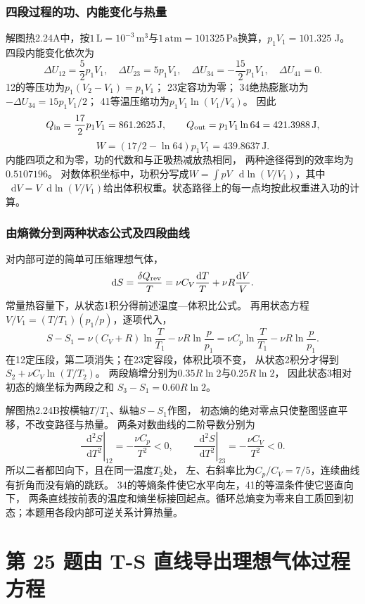 \documentclass[UTF8,fontset=fandol,a4paper,11pt]{ctexart}
\newcommand{\dd}{\mathop{}\!\mathrm{d}}
\begin{document}
\subsubsection*{四段过程的功、内能变化与热量}
解图热2.24A中，按$1\,\mathrm{L}=10^{-3}\,\mathrm{m^3}$与$1\,\mathrm{atm}=101325\,\mathrm{Pa}$换算，$p_1V_1=101.325$ J。
四段内能变化依次为
\[
\Delta U_{12}=\frac52p_1V_1,\quad
\Delta U_{23}=5p_1V_1,\quad
\Delta U_{34}=-\frac{15}{2}p_1V_1,\quad
\Delta U_{41}=0.
\]
12的等压功为$p_1(V_2-V_1)=p_1V_1$；
23定容功为零；
34绝热膨胀功为$-\Delta U_{34}=15p_1V_1/2$；
41等温压缩功为$p_1V_1\ln(V_1/V_4)$。
因此
\[
Q_{\rm in}=\frac{17}{2}p_1V_1=861.2625\,\mathrm J,\qquad
Q_{\rm out}=p_1V_1\ln64=421.3988\,\mathrm J,
\]
\[
W=(17/2-\ln64)p_1V_1=439.8637\,\mathrm J.
\]
内能四项之和为零，功的代数和与正吸热减放热相同，
两种途径得到的效率均为$0.5107196$。
对数体积坐标中，功积分写成$W=\int pV\,\dd\ln(V/V_1)$，其中
$\dd V=V\dd\ln(V/V_1)$给出体积权重。状态路径上的每一点均按此权重进入功的计算。

\subsubsection*{由熵微分到两种状态公式及四段曲线}
对内部可逆的简单可压缩理想气体，
\[
\dd S=\frac{\delta Q_{\rm rev}}T
=\nu C_V\frac{\dd T}{T}+\nu R\frac{\dd V}{V}.
\]
常量热容量下，从状态1积分得前述温度—体积比公式。
再用状态方程
$V/V_1=(T/T_1)(p_1/p)$，逐项代入，
\[
S-S_1=\nu(C_V+R)\ln\frac T{T_1}-\nu R\ln\frac p{p_1}
=\nu C_p\ln\frac T{T_1}-\nu R\ln\frac p{p_1}.
\]
在12定压段，第二项消失；在23定容段，体积比项不变，
从状态2积分才得到$S_2+\nu C_V\ln(T/T_2)$。
两段熵增分别为$0.35R\ln2$与$0.25R\ln2$，
因此状态3相对初态的熵坐标为两段之和 $S_3-S_1=0.60R\ln2$。

解图热2.24B按横轴$T/T_1$、纵轴$S-S_1$作图，
初态熵的绝对零点只使整图竖直平移，不改变路径与热量。
两条对数曲线的二阶导数分别为
\[
\left.\frac{\dd^2S}{\dd T^2}\right|_{12}
=-\frac{\nu C_p}{T^2}<0,\qquad
\left.\frac{\dd^2S}{\dd T^2}\right|_{23}
=-\frac{\nu C_V}{T^2}<0.
\]
所以二者都凹向下，且在同一温度$T_2$处，
左、右斜率比为$C_p/C_V=7/5$，连续曲线有折角而没有熵的跳跃。
34的等熵条件使它水平向左，41的等温条件使它竖直向下，
两条直线按前表的温度和熵坐标接回起点。循环总熵变为零来自工质回到初态；本题用各段内部可逆关系计算热量。




\section*{第 25 题\quad 由 T-S 直线导出理想气体过程方程}
\end{document}
